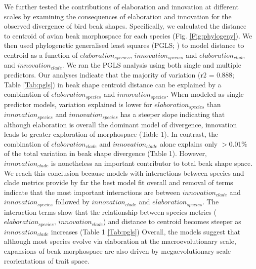 \documentclass[12pt,letterpaper]{article}
\begin{document}
We further tested the contributions of elaboration and innovation at different scales by examining the consequences of elaboration and innovation for the observed divergence of bird beak shapes.
Specifically, we calculated the distance to centroid of avian beak morphospace for each species (Fig. \ref{Fig:phylogeny}).
We then used phylogenetic generalised least squares (PGLS; \cite{phylom}) to model distance to centroid as a function of $elaboration_{species}$, $innovation_{species}$ and $elaboration_{clade}$ and $innovation_{clade}$.
We ran the PGLS analysis using both single and multiple predictors.
Our analyses indicate that the majority of variation (r2 = 0.888; Table \ref{Tab:pgls}) in beak shape centroid distance can be explained by a combination of $elaboration_{species}$ and $innovation_{species}$.
When modeled as single predictor models, variation explained is lower for $elaboration_{species}$ than $innovation_{species}$ and $innovation_{species}$ has a steeper slope indicating that although elaboration is overall the dominant model of divergence, innovation leads to greater exploration of morphospace (Table 1).
In contrast, the combination of $elaboration_{clade}$ and $innovation_{clade}$ alone explains only $>$0.01\% of the total variation in beak shape divergence (Table 1).
However, $innovation_{clade}$ is nonetheless an important contributor to total beak shape space.
We reach this conclusion because models with interactions between species and clade metrics provide by far the best model fit overall and removal of terms indicate that the most important interactions are between $innovation_{clade}$  and $innovation_{species}$ followed by $innovation_{clade}$ and $elaboration_{species}$.
The interaction terms show that the relationship between species metrics ($elaboration_{species}$, $innovation_{clade}$) and distance to centroid becomes steeper as $innovation_{clade}$ increases (Table 1 \ref{Tab:pgls})
Overall, the models suggest that although most species evolve via elaboration at the macroevolutionary scale, expansions of beak morphospace are also driven by megaevolutionary scale reorientations of trait space.
\end{document}

